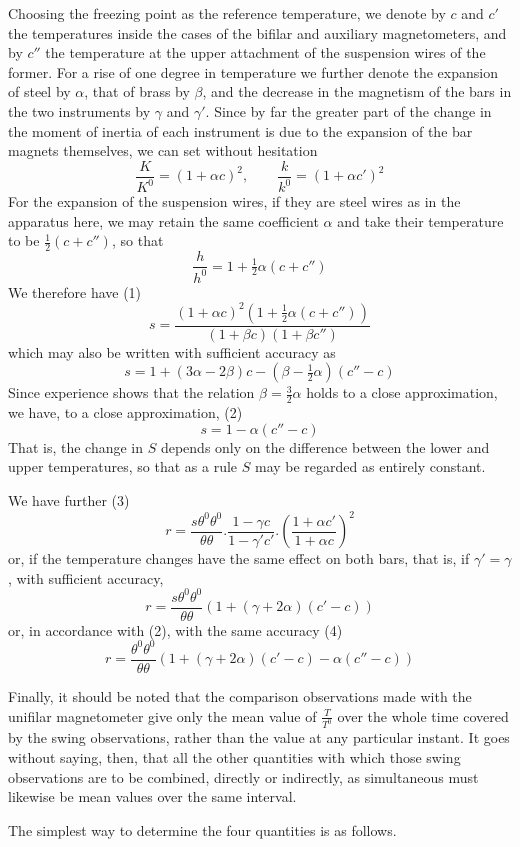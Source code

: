 Choosing the freezing point as the reference temperature, we denote by $c$ and $c'$ the temperatures inside the cases of the bifilar and auxiliary magnetometers, and by $c''$ the temperature at the upper attachment of the suspension wires of the former. For a rise of one degree in temperature we further denote the expansion of steel by $\alpha$, that of brass by $\beta$, and the decrease in the magnetism of the bars in the two instruments by $\gamma$ and $\gamma'$. Since by far the greater part of the change in the moment of inertia of each instrument is due to the expansion of the bar magnets themselves, we can set without hesitation
\[
\frac{K}{K^0}=(1+\alpha c)^2,\qquad \frac{k}{k^0}=(1+\alpha c')^2
\]
For the expansion of the suspension wires, if they are steel wires as in the apparatus here, we may retain the same coefficient $\alpha$ and take their temperature to be $\tfrac{1}{2}(c+c'')$, so that
\[
\frac{h}{h^0}=1+\tfrac{1}{2}\alpha(c+c'')
\]
We therefore have (1)
\[
s=\frac{(1+\alpha c)^2(1+\tfrac{1}{2}\alpha(c+c''))}{(1+\beta c)(1+\beta c'')}
\]
which may also be written with sufficient accuracy as
\[
s=1+(3\alpha-2\beta)c-(\beta-\tfrac{1}{2}\alpha)(c''-c)
\]
Since experience shows that the relation $\beta=\tfrac{3}{2}\alpha$ holds to a close approximation, we have, to a close approximation, (2)
\[
s=1-\alpha(c''-c)
\]
That is, the change in $S$ depends only on the difference between the lower and upper temperatures, so that as a rule $S$ may be regarded as entirely constant.

We have further (3)
\[
r=\frac{s\theta^0\theta^0}{\theta\theta}.\frac{1-\gamma c}{1-\gamma'c'}.\left(\frac{1+\alpha c'}{1+\alpha c}\right)^2
\]
or, if the temperature changes have the same effect on both bars, that is, if $\gamma'=\gamma$, with sufficient accuracy,
\[
r=\frac{s\theta^0\theta^0}{\theta\theta}(1+(\gamma+2\alpha)(c'-c))
\]
or, in accordance with (2), with the same accuracy (4)
\[
r=\frac{\theta^0\theta^0}{\theta\theta}(1+(\gamma+2\alpha)(c'-c)-\alpha(c''-c))
\]

Finally, it should be noted that the comparison observations made with the unifilar magnetometer give only the mean value of $\frac{T}{T^0}$ over the whole time covered by the swing observations, rather than the value at any particular instant. It goes without saying, then, that all the other quantities with which those swing observations are to be combined, directly or indirectly, as simultaneous must likewise be mean values over the same interval.

The simplest way to determine the four quantities is as follows.

